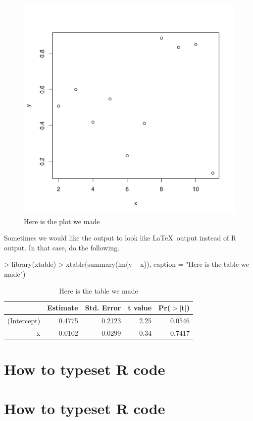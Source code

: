 \documentclass[12pt]{article}         %
\begin{document}
\begin{figure}
\includegraphics{coursework-007}
\caption{Here is the plot we made}
\end{figure}


Sometimes we would like the output to look like \LaTeX\ output instead of \textsf{R} output.  In that case, do the following.

\begin{Schunk}
\begin{Sinput}
> library(xtable)
> xtable(summary(lm(y ~ x)), caption = "Here is the table we made")
\end{Sinput}
\begin{table}[ht]
\centering
\begin{tabular}{rrrrr}
  \hline
 & Estimate & Std. Error & t value & Pr($>$$|$t$|$) \\ 
  \hline
(Intercept) & 0.4775 & 0.2123 & 2.25 & 0.0546 \\ 
  x & 0.0102 & 0.0299 & 0.34 & 0.7417 \\ 
   \hline
\end{tabular}
\caption{Here is the table we made} 
\end{table}\end{Schunk}

\pagebreak 
\section{How to typeset \textsf{R} code}
\pagebreak 
\section{How to typeset \textsf{R} code}
\end{document}
